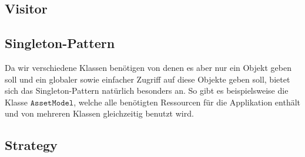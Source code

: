 \subsection{Visitor}

\subsection{Singleton-Pattern}
Da wir verschiedene Klassen benötigen von denen es aber nur ein Objekt geben soll und ein globaler sowie einfacher Zugriff auf diese Objekte geben soll, bietet sich das Singleton-Pattern natürlich besonders an. So gibt es beispielsweise die Klasse $\texttt{AssetModel}$, welche alle benötigten Ressourcen für die Applikation enthält und von mehreren Klassen gleichzeitig benutzt wird.

\subsection{Strategy}
